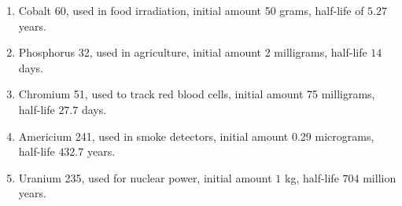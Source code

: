 \begin{enumerate}
\setcounter{enumi}{\value{HW}}

\item  Cobalt 60, used in food irradiation, initial amount 50 grams, half-life of $5.27$ years.  \label{radioactivefirst}

\item  Phosphorus 32, used in agriculture, initial amount 2 milligrams, half-life $14$ days.

\item  Chromium 51, used to track red blood cells, initial amount 75 milligrams, half-life  $27.7$ days.

\item  Americium 241, used in smoke detectors, initial amount 0.29 micrograms, half-life $432.7$ years.

\item  Uranium 235, used for nuclear power, initial amount $1$ kg, half-life  $704$ million years. \label{radioactivelast}

\setcounter{HW}{\value{enumi}}
\end{enumerate}

